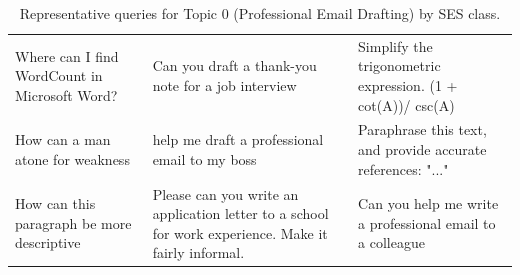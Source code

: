 \begin{table}[ht]
\begin{tabular}{p{4.3cm}p{4.3cm}p{4.3cm}}
Where can I find WordCount in Microsoft Word? & Can you draft a thank-you note for a job interview & Simplify the trigonometric expression.   (1 + cot(A))/ csc(A) \\[4pt]
How can a man atone for weakness & help me draft a professional email to my boss & Paraphrase this text, and provide accurate references: "..." \\[4pt]
How can this paragraph be more descriptive & Please can you write an application letter to a school for work experience. Make it fairly informal. & Can you help me write a professional email to a colleague \\[4pt]
\bottomrule
\end{tabular}
\caption{Representative queries for Topic 0 (Professional Email Drafting) by SES class.}
\label{tab:repr_queries_topic0}
\end{table}


